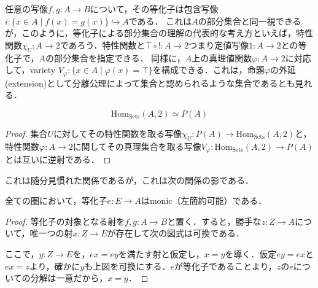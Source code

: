 \documentclass[uplatex, 12pt, dvipdfmx]{jsarticle}
\begin{document}
\begin{example}[Setsでは等化子は部分集合と同一視できる]\label{example-equalizer-Sets}
    任意の写像$f,g:A\to B$について，その等化子は包含写像$i:\{ x\in A\mid f(x)=g(x) \}\hookrightarrow A$である．
    これは$A$の部分集合と同一視できるが，このように，等化子による部分集合の理解の代表的な考え方といえば，特性関数$\chi_U:A\to 2$であろう．特性関数と$\top\circ !:A\to 2$つまり定値写像$1:A\to 2$との等化子で，$A$の部分集合を指定できる．
    同様に，$A$上の真理値関数$\varphi:A\to 2$に対応して，variety $V_\varphi:\{x\in A\mid \varphi(x)=\top\}$を構成できる．これは，命題$\varphi$の外延(extension)として分離公理によって集合と認められるような集合であるとも見れる．
    \begin{proposition*}[等化子の文脈で]
        \[ \mathrm{Hom}_{\mathrm{Sets}}(A,2)\simeq P(A) \]
    \end{proposition*}
    \begin{proof}
        集合$U$に対してその特性関数を取る写像$\chi_U:P(A)\to\mathrm{Hom}_{\mathrm{Sets}}(A,2)$と，特性関数$\varphi:A\to 2$に関してその真理集合を取る写像$V_\varphi:\mathrm{Hom}_{\mathrm{Sets}}(A,2)\to P(A)$とは互いに逆射である．
    \end{proof}
    これは随分見慣れた関係であるが，これは次の関係の影である．
    \begin{proposition}\label{prop-equalizer-monic}
        全ての圏において，等化子$e:E\to A$はmonic（左簡約可能）である．
    \end{proposition}
    \begin{proof}
        等化子の対象となる射を$f,g:A\to B$と置く．すると，勝手な$z:Z\to A$について，唯一つの射$x:Z\to E$が存在して次の図式は可換である．
        \begin{center}\end{center}
        ここで，$y:Z\to E$を，$ex=ey$を満たす射と仮定し，$x=y$を導く．仮定$ey=ex$と$ex=z$より，確かに$y$も上図を可換にする．$e$が等化子であることより，$z$の$e$についての分解は一意だから，$x=y$．
    \end{proof}
\end{example}
\end{document}
